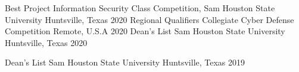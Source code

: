 \begin{cvhonors}

  \cvhonor
    {Best Project} %
    {Information Security Class Competition, Sam Houston State University} %
    {Huntsville, Texas} %
    {2020} %
  \cvhonor
    {Regional Qualifiers} %
    {Collegiate Cyber Defense Competition} %
    {Remote, U.S.A} %
    {2020} %
  \cvhonor
    {Dean's List} %
    {Sam Houston State University} %
    {Huntsville, Texas} %
    {2020} %

  \cvhonor
    {Dean's List} %
    {Sam Houston State University} %
    {Huntsville, Texas} %
    {2019} %

\end{cvhonors}

